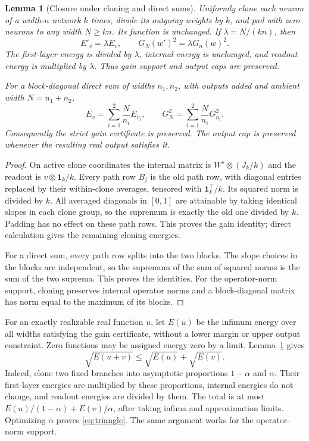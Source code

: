 \documentclass[11pt]{article}
\newtheorem{lemma}[theorem]{Lemma}
\theoremstyle{remark}\newtheorem{remark}[theorem]{Remark}
\begin{document}
\begin{lemma}[Closure under cloning and direct sums]\label{lem:closure}
Uniformly clone each neuron of a width-$n$ network $k$ times, divide its
outgoing weights by $k$, and pad with zero neurons to any width $N\ge kn$.
Its function is unchanged. If $\lambda=N/(kn)$, then
\[
 E'_v=\lambda E_v,\qquad G_N(w')^2=\lambda G_n(w)^2.
\]
The first-layer energy is divided by $\lambda$, internal energy is
unchanged, and readout energy is multiplied by $\lambda$.
Thus gain support and output caps are preserved.

For a block-diagonal direct sum of widths $n_1,n_2$, with outputs added
and ambient width $N=n_1+n_2$,
\[
 E_v=\sum_{i=1}^2\frac N{n_i}E_{v_i},\qquad
 G_N^2=\sum_{i=1}^2\frac N{n_i}G_{n_i}^2.
\]
Consequently the strict gain certificate is preserved. The output cap
is preserved whenever the resulting real output satisfies it.
\end{lemma}
\begin{proof}
On active clone coordinates the internal matrix is
$W^s\otimes(J_k/k)$ and the readout is $v\otimes\mathbf1_k/k$.
Every path row $B_j$ is the old path row, with diagonal entries replaced
by their within-clone averages, tensored with $\mathbf1_k^\top/k$.
Its squared norm is divided by $k$. All averaged diagonals in $[0,1]$
are attainable by taking identical slopes in each clone group, so the
supremum is exactly the old one divided by $k$. Padding has no effect
on these path rows. This proves the gain identity; direct calculation
gives the remaining cloning energies.

For a direct sum, every path row splits into the two blocks. The slope
choices in the blocks are independent, so the supremum of the sum of
squared norms is the sum of the two suprema. This proves the identities.
For the operator-norm support, cloning preserves internal operator norms
and a block-diagonal matrix has norm equal to the maximum of its blocks.
\end{proof}

For an exactly realizable real function $u$, let $E(u)$ be the infimum
energy over all widths satisfying the gain certificate, without a lower
margin or upper output constraint. Zero functions may be assigned energy
zero by a limit. Lemma~\ref{lem:closure} gives
\begin{equation}\label{eq:triangle}
 \sqrt{E(u+v)}\le\sqrt{E(u)}+\sqrt{E(v)}.
\end{equation}
Indeed, clone two fixed branches into asymptotic proportions $1-\alpha$
and $\alpha$. Their first-layer energies are multiplied by these
proportions, internal energies do not change, and readout energies are
divided by them. The total is at most
$E(u)/(1-\alpha)+E(v)/\alpha$, after taking infima and approximation
limits. Optimizing $\alpha$ proves \eqref{eq:triangle}. The same
argument works for the operator-norm support.
\end{document}
